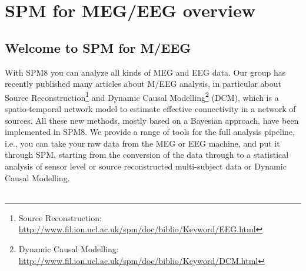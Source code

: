 \chapter{SPM for MEG/EEG overview \label{Chap:eeg:overview}}

\section{Welcome to SPM for M/EEG}

With SPM8 you can analyze all kinds of MEG and EEG data. Our group has recently published many articles about M/EEG analysis, in particular about Source Reconstruction\footnote{Source Reconstruction: \url{http://www.fil.ion.ucl.ac.uk/spm/doc/biblio/Keyword/EEG.html}} and Dynamic Causal Modelling\footnote{Dynamic Causal Modelling: \url{http://www.fil.ion.ucl.ac.uk/spm/doc/biblio/Keyword/DCM.html}} (DCM), which is a spatio-temporal network model to estimate effective connectivity in a network of sources. All these new methods, mostly based on a Bayesian approach, have been implemented in SPM8. We provide a range of tools for the full analysis pipeline, i.e., you can take your raw data from the MEG or EEG machine, and put it through SPM, starting from the conversion of the data through to a statistical analysis of sensor level or source reconstructed multi-subject data or Dynamic Causal Modelling.
\\
\\
